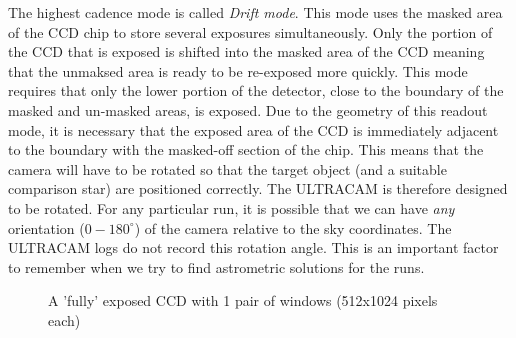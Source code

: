The highest cadence mode is called \emph{Drift mode}. This mode uses the masked area of the CCD chip to store several exposures simultaneously. Only the portion of the CCD that is exposed is shifted into the masked area of the CCD meaning that the unmaksed area is ready to be re-exposed more quickly. This mode requires that only the lower portion of the detector, close to the boundary of the masked and un-masked areas, is exposed. Due to the geometry of this readout mode, it is necessary that the exposed area of the CCD is immediately adjacent to the boundary with the masked-off section of the chip. This means that the camera will have to be rotated so that the target object (and a suitable comparison star) are positioned correctly. The ULTRACAM is therefore designed to be rotated. For any particular run, it is possible that we can have \emph{any} orientation ($0-180^{\circ}$) of the camera relative to the sky coordinates. The ULTRACAM logs do not record this rotation angle. This is an important factor to remember when we try to find astrometric solutions for the runs.    

\begin{figure}
  \centering
  \setlength{\fboxsep}{0pt}
  \setlength{\fboxrule}{1pt}
  \caption{A 'fully' exposed CCD with 1 pair of windows (512x1024 pixels each)}
  \label{fig:KOI-824}
\end{figure}

